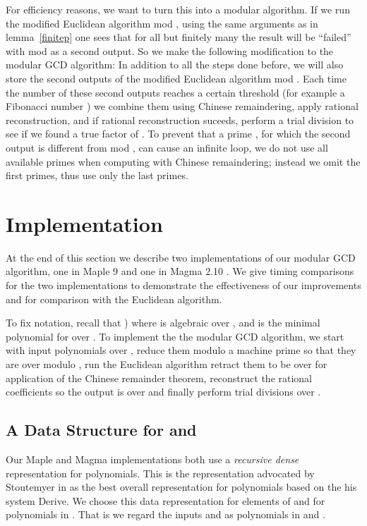 \documentclass[10pt]{article}
\begin{document}
For efficiency reasons, we want to turn this into a modular algorithm.
If we run the modified Euclidean algorithm mod ,
using the same arguments as in lemma~\ref{finitep} one sees that for
all but finitely many  the result will be ``failed'' with
 mod  as a second output.
So we make the following modification to the modular GCD algorithm:
In addition to all the steps done before, we will also store the
second outputs of the modified Euclidean algorithm mod .
Each time the number of these second outputs reaches a certain threshold
(for example a Fibonacci number ) we combine them using Chinese remaindering,
apply rational reconstruction, and if rational reconstruction suceeds,
perform a trial division to see if we found a true factor  of .
To prevent that a prime , for which the second output is different
from  mod , can cause an infinite loop, we do not use
all available primes when computing  with Chinese remaindering; instead
we omit the first  primes, thus use only the last  primes.

\section{Implementation}
At the end of this section we describe two implementations of our
modular GCD algorithm, one in Maple 9 \cite{Maple} and one in Magma 2.10 \cite{Magma}.
We give timing comparisons for the two implementations to demonstrate
the effectiveness of our improvements and for comparison with the Euclidean algorithm.

To fix notation, recall that )
where  is algebraic over ,
and  is the minimal polynomial for  over .
To implement the the modular GCD algorithm, we start with input polynomials
over , reduce them modulo  a machine prime so that they are over  modulo ,
run the Euclidean algorithm retract them to be over  for application of the
Chinese remainder theorem, reconstruct the rational coefficients so the output
is over  and finally perform trial divisions over .





\subsection{A Data Structure for  and }
Our Maple and Magma implementations both use a {\em recursive
dense} representation for polynomials. This is the representation
advocated by Stoutemyer in \cite{David} as the best overall
representation for polynomials based on the his system Derive.
We choose this data representation for elements of  and for
polynomials in . That is we regard the inputs  and 
as polynomials in  and . 
\end{document}
